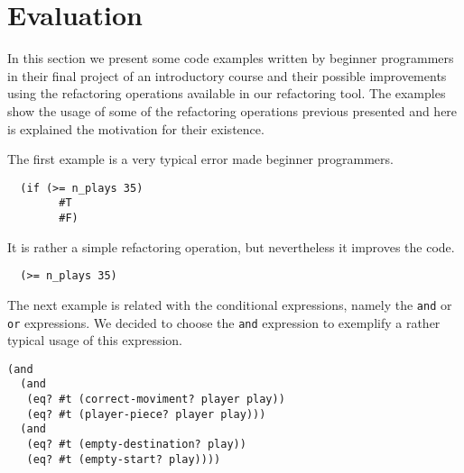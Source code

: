 

\section{Evaluation}
In this section we present some code examples written by beginner programmers
in their final project of an introductory course and their possible improvements
using the refactoring operations available in our refactoring tool.
The examples show the usage of some of the refactoring operations previous presented
and here is explained the motivation for their existence.

\lstset{style=racket}


The first example is a very typical error made beginner programmers.
\begin{lstlisting}
  (if (>= n_plays 35)
        #T
        #F)
\end{lstlisting}
It is rather a simple refactoring operation, but nevertheless it improves the code.
\begin{lstlisting}
  (>= n_plays 35)
\end{lstlisting}

The next example is related with the conditional expressions, namely the {\tt and}
or {\tt or} expressions. We decided to choose the {\tt and} expression to exemplify a
rather typical usage of this expression.
\begin{lstlisting}
(and
  (and
   (eq? #t (correct-moviment? player play))
   (eq? #t (player-piece? player play)))
  (and
   (eq? #t (empty-destination? play))
   (eq? #t (empty-start? play))))
\end{lstlisting}


